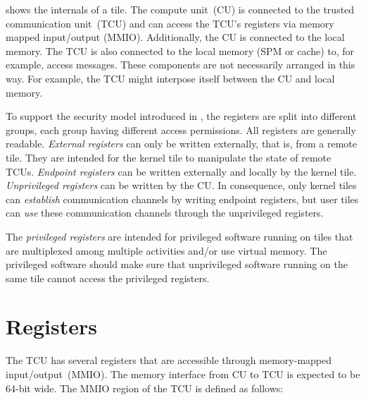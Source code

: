  shows the internals of a tile. The compute unit~(CU) is
connected to the trusted communication unit~(TCU) and can access the TCU's registers via memory
mapped input/output (MMIO). Additionally, the CU is connected to the local memory. The TCU is also
connected to the local memory (SPM or cache) to, for example, access messages. These components are
not necessarily arranged in this way. For example, the TCU might interpose itself between the CU and
local memory.

To support the security model introduced in , the registers are split into
different groups, each group having different access permissions. All registers are generally
readable. \emph{External registers} can only be written externally, that is, from a remote tile. They
are intended for the kernel tile to manipulate the state of remote TCUs. \emph{Endpoint registers} can
be written externally and locally by the kernel tile. \emph{Unprivileged registers} can be written by
the CU. In consequence, only kernel tiles can \emph{establish} communication channels by writing
endpoint registers, but user tiles can \emph{use} these communication channels through the
unprivileged registers.

 The \emph{privileged registers} are intended for privileged software running on tiles
that are multiplexed among multiple activities and/or use virtual memory. The privileged software should
make sure that unprivileged software running on the same tile cannot access the privileged registers.
\extend{}

\section{Registers}

The TCU has several registers that are accessible through memory-mapped input/output~(MMIO). The
memory interface from CU to TCU is expected to be 64-bit wide. The MMIO region of the TCU is defined
as follows:

